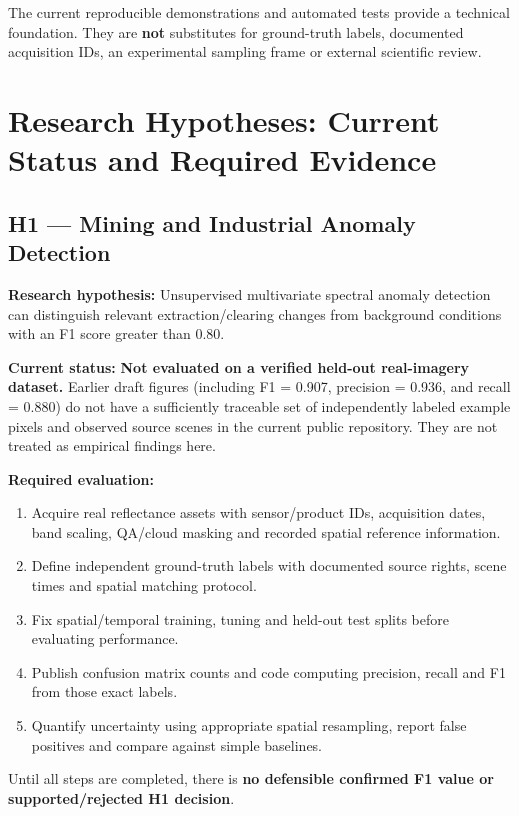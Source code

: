 The current reproducible demonstrations and automated tests provide a technical foundation. They are \textbf{not} substitutes for ground-truth labels, documented acquisition IDs, an experimental sampling frame or external scientific review.

\section{Research Hypotheses: Current Status and Required Evidence}

\subsection{H1 — Mining and Industrial Anomaly Detection}

\textbf{Research hypothesis:} Unsupervised multivariate spectral anomaly detection can distinguish relevant extraction/clearing changes from background conditions with an F1 score greater than 0.80.

\textbf{Current status:} \textbf{Not evaluated on a verified held-out real-imagery dataset.} Earlier draft figures (including F1 = 0.907, precision = 0.936, and recall = 0.880) do not have a sufficiently traceable set of independently labeled example pixels and observed source scenes in the current public repository. They are not treated as empirical findings here.

\textbf{Required evaluation:}

\begin{enumerate}
  \item Acquire real reflectance assets with sensor/product IDs, acquisition dates, band scaling, QA/cloud masking and recorded spatial reference information.
  \item Define independent ground-truth labels with documented source rights, scene times and spatial matching protocol.
  \item Fix spatial/temporal training, tuning and held-out test splits before evaluating performance.
  \item Publish confusion matrix counts and code computing precision, recall and F1 from those exact labels.
  \item Quantify uncertainty using appropriate spatial resampling, report false positives and compare against simple baselines.

\end{enumerate}
Until all steps are completed, there is \textbf{no defensible confirmed F1 value or supported/rejected H1 decision}.

